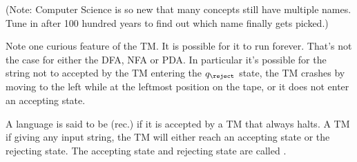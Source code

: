 (Note: 
Computer Science is so new that many concepts still have multiple names.
Tune in after 100 hundred years to find out which name finally gets picked.)


Note one curious feature of the TM. It is possible for it to run
forever. That's not the case for either the DFA, NFA or PDA. In
particular it's possible for the string not to accepted by the TM
entering the $q_{\reject}$ state, the TM crashes by moving to the
left while at the leftmost position on the tape, or it does not
enter an accepting state.

\begin{defn}
A language is said to be  (rec.) if it is
accepted by a TM that always halts. A TM  if
giving any input string, the TM will either reach an accepting
state or the rejecting state. The accepting state and rejecting
state are called .
\end{defn}

